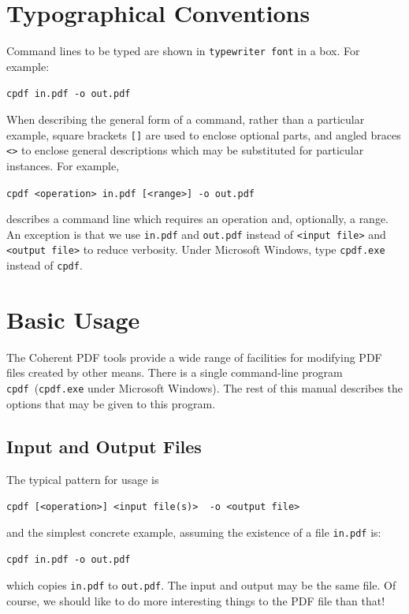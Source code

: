 \documentclass[a4paper,makeidx]{memoir}
\newcommand{\cpdf}{\texttt{cpdf}}
\begin{document}
\chapter*{Typographical Conventions}
Command lines to be typed are shown in \texttt{typewriter font} in a box.
For example:
\begin{framed}
\small\verb!cpdf in.pdf -o out.pdf!
\end{framed}
\noindent When describing the general form of a command, rather than a particular
example, square brackets \verb|[]| are used to enclose optional parts, and
angled braces \verb!<>! to enclose general descriptions which may be
substituted for particular instances. For example,
\begin{framed}
\small\verb!cpdf <operation> in.pdf [<range>] -o out.pdf!
\end{framed}
\noindent describes a command line which requires an operation and, optionally,
a range. An exception is that we use \texttt{in.pdf} and \texttt{out.pdf}
instead of \texttt{<input file>} and \texttt{<output file>} to reduce
verbosity. Under Microsoft Windows, type \texttt{cpdf.exe} instead of \texttt{cpdf}.
\cleardoublepage
\mainmatter
{}
\pagestyle{ruled}
\chapter{Basic Usage}
  The Coherent PDF tools provide a wide range of facilities for modifying PDF
files created by other means. There is a single command-line program
\cpdf\ (\texttt{cpdf.exe} under Microsoft Windows). The rest of this manual describes the options that may be given
to this program.
   
  \section{Input and Output Files}
  The typical pattern for usage is
  \begin{framed}
  \small\verb!cpdf [<operation>] <input file(s)>  -o <output file>!
  \end{framed}
  \noindent and the simplest concrete example, assuming the existence of a file
\texttt{in.pdf} is:
  \begin{framed}
  \small\verb!cpdf in.pdf -o out.pdf!
  \end{framed}
  \noindent which copies \texttt{in.pdf} to \texttt{out.pdf}. The input and
output may be the same file. Of course, we should like to do more interesting
things to the PDF file than that!
\end{document}
